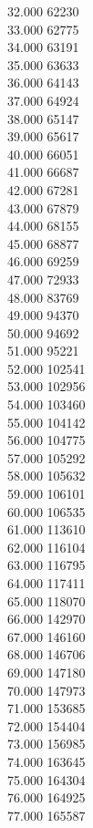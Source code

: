 { 32.000	62230 \\
 33.000	62775 \\
 34.000	63191 \\
 35.000	63633 \\
 36.000	64143 \\
 37.000	64924 \\
 38.000	65147 \\
 39.000	65617 \\
 40.000	66051 \\
 41.000	66687 \\
 42.000	67281 \\
 43.000	67879 \\
 44.000	68155 \\
 45.000	68877 \\
 46.000	69259 \\
 47.000	72933 \\
 48.000	83769 \\
 49.000	94370 \\
 50.000	94692 \\
 51.000	95221 \\
 52.000	102541 \\
 53.000	102956 \\
 54.000	103460 \\
 55.000	104142 \\
 56.000	104775 \\
 57.000	105292 \\
 58.000	105632 \\
 59.000	106101 \\
 60.000	106535 \\
 61.000	113610 \\
 62.000	116104 \\
 63.000	116795 \\
 64.000	117411 \\
 65.000	118070 \\
 66.000	142970 \\
 67.000	146160 \\
 68.000	146706 \\
 69.000	147180 \\
 70.000	147973 \\
 71.000	153685 \\
 72.000	154404 \\
 73.000	156985 \\
 74.000	163645 \\
 75.000	164304 \\
 76.000	164925 \\
 77.000	165587 \\
}

